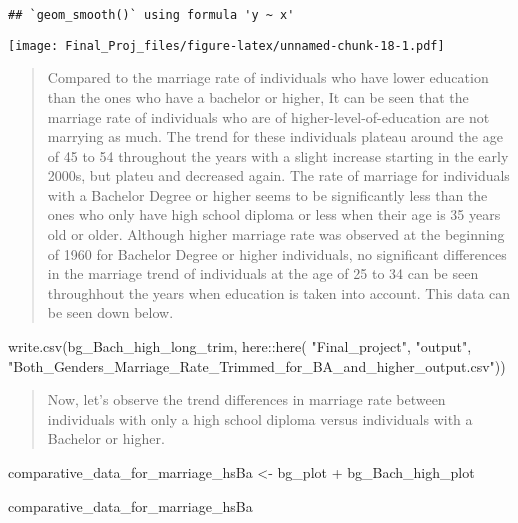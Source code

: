 \documentclass[
]{article}
\newenvironment{Shaded}{\begin{snugshade}}{\end{snugshade}}
\newcommand{\FunctionTok}[1]{\textcolor[rgb]{0.00,0.00,0.00}{#1}}
\newcommand{\NormalTok}[1]{#1}
\newcommand{\OtherTok}[1]{\textcolor[rgb]{0.56,0.35,0.01}{#1}}
\newcommand{\SpecialCharTok}[1]{\textcolor[rgb]{0.00,0.00,0.00}{#1}}
\newcommand{\StringTok}[1]{\textcolor[rgb]{0.31,0.60,0.02}{#1}}
\begin{document}
\begin{verbatim}
## `geom_smooth()` using formula 'y ~ x'
\end{verbatim}

\texttt{[image: Final\_Proj\_files/figure-latex/unnamed-chunk-18-1.pdf]}

\begin{quote}
Compared to the marriage rate of individuals who have lower education
than the ones who have a bachelor or higher, It can be seen that the
marriage rate of individuals who are of higher-level-of-education are
not marrying as much. The trend for these individuals plateau around the
age of 45 to 54 throughout the years with a slight increase starting in
the early 2000s, but plateu and decreased again. The rate of marriage
for individuals with a Bachelor Degree or higher seems to be
significantly less than the ones who only have high school diploma or
less when their age is 35 years old or older. Although higher marriage
rate was observed at the beginning of 1960 for Bachelor Degree or higher
individuals, no significant differences in the marriage trend of
individuals at the age of 25 to 34 can be seen throughhout the years
when education is taken into account. This data can be seen down below.
\end{quote}

\begin{Shaded}
\begin{Highlighting}[]
\FunctionTok{write.csv}\NormalTok{(bg\_Bach\_high\_long\_trim,}
\NormalTok{          here}\SpecialCharTok{::}\FunctionTok{here}\NormalTok{(}
            \StringTok{"Final\_project"}\NormalTok{, }
            \StringTok{"output"}\NormalTok{, }
            \StringTok{"Both\_Genders\_Marriage\_Rate\_Trimmed\_for\_BA\_and\_higher\_output.csv"}\NormalTok{))}
\end{Highlighting}
\end{Shaded}

\begin{quote}
Now, let's observe the trend differences in marriage rate between
individuals with only a high school diploma versus individuals with a
Bachelor or higher.
\end{quote}

\begin{Shaded}
\begin{Highlighting}[]
\NormalTok{comparative\_data\_for\_marriage\_hsBa }\OtherTok{\textless{}{-}}\NormalTok{ bg\_plot }\SpecialCharTok{+}\NormalTok{ bg\_Bach\_high\_plot}

\NormalTok{comparative\_data\_for\_marriage\_hsBa}
\end{Highlighting}
\end{Shaded}
\end{document}
